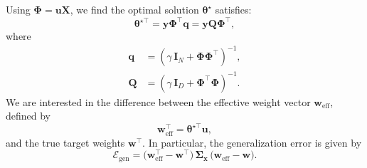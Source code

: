 \documentclass[11pt]{article}
\theoremstyle{plain}
\theoremstyle{definition}
\theoremstyle{remark}
\begin{document}
Using $\boldsymbol{\Phi} = \mathbf{u} \mathbf{X}$, we find the optimal solution $\boldsymbol{\theta}^\star$ satisfies:
\begin{equation}
    \boldsymbol{\theta}^{\star\!\top} = \mathbf{y} \boldsymbol{\Phi}^\top \mathbf{q} = \mathbf{y} \mathbf{Q} \boldsymbol{\Phi}^\top,
    \label{eq:thetaSolved}
\end{equation}
where
\begin{equation*}
\begin{split}
    \mathbf{q} &= (\gamma\, \mathbf{I}_N + \boldsymbol{\Phi} \boldsymbol{\Phi}^\top)^{-1}, \\
    \mathbf{Q} &= (\gamma\, \mathbf{I}_D + \boldsymbol{\Phi}^\top \boldsymbol{\Phi})^{-1}.
\end{split}
\end{equation*}
We are interested in the difference between the effective weight vector $\mathbf{w}_{\text{eff}}$, defined by
\[
\mathbf{w}_{\text{eff}}^{\top} = \boldsymbol{\theta}^{\star\!\top} \mathbf{u},
\]
and the true target weights $\mathbf{w}^{\top}$. In particular, the generalization error is given by
\begin{equation*}
    \mathcal{E}_{\text{gen}} = 
    \bigl(\mathbf{w}_{\text{eff}}^{\top} - \mathbf{w}^{\top}\bigr)
    \,\boldsymbol{\Sigma}_{\mathbf{x}}\,
    \bigl(\mathbf{w}_{\text{eff}} - \mathbf{w}\bigr).
\end{equation*}
\end{document}
